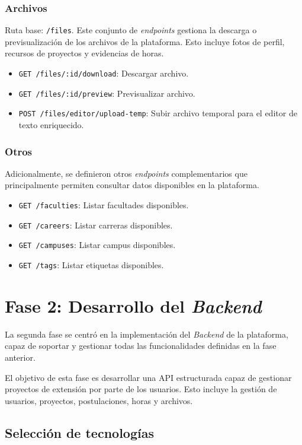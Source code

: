 \subsubsection{Archivos}
Ruta base: \texttt{/files}. Este conjunto de \textit{endpoints} gestiona la descarga o previsualización de los archivos
de la plataforma. Esto incluye fotos de perfil, recursos de proyectos y evidencias de horas.
\begin{itemize}
    \item \texttt{GET /files/:id/download}: Descargar archivo.
    \item \texttt{GET /files/:id/preview}: Previsualizar archivo.
    \item \texttt{POST /files/editor/upload-temp}: Subir archivo temporal para el editor de texto enriquecido.
\end{itemize}

\subsubsection{Otros}
Adicionalmente, se definieron otros \textit{endpoints} complementarios que principalmente permiten consultar datos
disponibles en la plataforma.
\begin{itemize}
    \item \texttt{GET /faculties}: Listar facultades disponibles.
    \item \texttt{GET /careers}: Listar carreras disponibles.
    \item \texttt{GET /campuses}: Listar campus disponibles.
    \item \texttt{GET /tags}: Listar etiquetas disponibles.
\end{itemize}

\section{Fase 2: Desarrollo del \textit{Backend}}
La segunda fase se centró en la implementación del \textit{Backend} de la plataforma, capaz de soportar y gestionar
todas las funcionalidades definidas en la fase anterior. 

El objetivo de esta fase es desarrollar una API estructurada capaz de gestionar proyectos de extensión por parte de
los usuarios. Esto incluye la gestión de usuarios, proyectos, postulaciones, horas y archivos.

\subsection{Selección de tecnologías}

